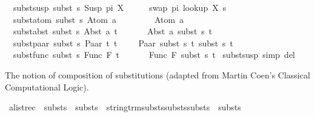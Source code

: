 \begin{isabellebody}
\ \ subst{\isacharunderscore}{\kern0pt}susp{\isacharcolon}{\kern0pt}\ {\isachardoublequoteopen}subst\ s\ {\isacharparenleft}{\kern0pt}Susp\ pi\ X{\isacharparenright}{\kern0pt}\ \ \ \ \ {\isacharequal}{\kern0pt}\ swap\ pi\ {\isacharparenleft}{\kern0pt}look{\isacharunderscore}{\kern0pt}up\ X\ s{\isacharparenright}{\kern0pt}{\isachardoublequoteclose}\ {\isacharbar}{\kern0pt}\isanewline
\ \ subst{\isacharunderscore}{\kern0pt}atom{\isacharcolon}{\kern0pt}\ {\isachardoublequoteopen}subst\ s\ {\isacharparenleft}{\kern0pt}Atom\ a{\isacharparenright}{\kern0pt}\ \ \ \ \ \ \ \ {\isacharequal}{\kern0pt}\ Atom\ a{\isachardoublequoteclose}\ {\isacharbar}{\kern0pt}\isanewline
\ \ subst{\isacharunderscore}{\kern0pt}abst{\isacharcolon}{\kern0pt}\ {\isachardoublequoteopen}subst\ s\ {\isacharparenleft}{\kern0pt}Abst\ a\ t{\isacharparenright}{\kern0pt}\ \ \ \ \ \ {\isacharequal}{\kern0pt}\ Abst\ a\ {\isacharparenleft}{\kern0pt}subst\ s\ t{\isacharparenright}{\kern0pt}{\isachardoublequoteclose}\ {\isacharbar}{\kern0pt}\isanewline
\ \ subst{\isacharunderscore}{\kern0pt}paar{\isacharcolon}{\kern0pt}\ {\isachardoublequoteopen}subst\ s\ {\isacharparenleft}{\kern0pt}Paar\ t{}\ t{}{\isacharparenright}{\kern0pt}\ \ \ \ {\isacharequal}{\kern0pt}\ Paar\ {\isacharparenleft}{\kern0pt}subst\ s\ t{}{\isacharparenright}{\kern0pt}\ {\isacharparenleft}{\kern0pt}subst\ s\ t{}{\isacharparenright}{\kern0pt}{\isachardoublequoteclose}\ {\isacharbar}{\kern0pt}\isanewline
\ \ subst{\isacharunderscore}{\kern0pt}func{\isacharcolon}{\kern0pt}\ {\isachardoublequoteopen}subst\ s\ {\isacharparenleft}{\kern0pt}Func\ F\ t{\isacharparenright}{\kern0pt}\ \ \ \ \ \ {\isacharequal}{\kern0pt}\ Func\ F\ {\isacharparenleft}{\kern0pt}subst\ s\ t{\isacharparenright}{\kern0pt}{\isachardoublequoteclose}\isanewline
\isanewline
{}\isamarkupfalse%
\ subst{\isacharunderscore}{\kern0pt}susp\ {\isacharbrackleft}{\kern0pt}simp\ del{\isacharbrackright}{\kern0pt}%
\begin{isamarkuptext}%
The notion of composition of substitutions (adapted from Martin Coen's Classical 
 Computational Logic).%
\end{isamarkuptext}\isamarkuptrue%
\isamarkupfalse%
\ alist{\isacharunderscore}{\kern0pt}rec\ {\isacharcolon}{\kern0pt}{\isacharcolon}{\kern0pt}\ {\isachardoublequoteopen}substs\ {\isasymRightarrow}\ substs\ {\isasymRightarrow}\ {\isacharparenleft}{\kern0pt}string{\isasymRightarrow}trm{\isasymRightarrow}substs{\isasymRightarrow}substs{\isasymRightarrow}substs{\isacharparenright}{\kern0pt}\ {\isasymRightarrow}\ substs{\isachardoublequoteclose}\ \isanewline

\end{isabellebody}
